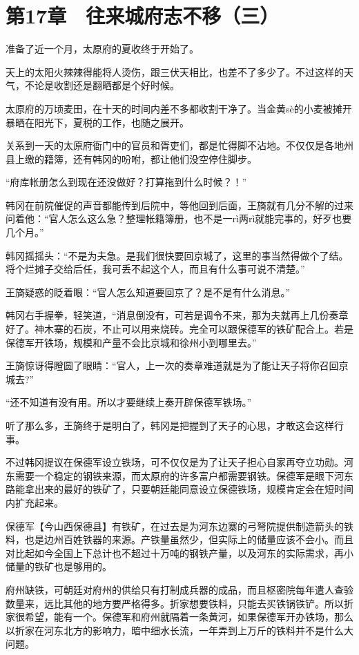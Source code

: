 \section{第17章　往来城府志不移（三）}

准备了近一个月，太原府的夏收终于开始了。

天上的太阳火辣辣得能将人烫伤，跟三伏天相比，也差不了多少了。不过这样的天气，不论是收割还是翻晒都是个好时候。

太原府的万顷麦田，在十天的时间内差不多都收割干净了。当金黄sè的小麦被摊开暴晒在阳光下，夏税的工作，也随之展开。

关系到一天的太原府衙门中的官员和胥吏们，都是忙得脚不沾地。不仅仅是各地州县上缴的籍簿，还有韩冈的吩咐，都让他们没空停住脚步。

“府库帐册怎么到现在还没做好？打算拖到什么时候？！”

韩冈在前院催促的声音都能传到后院中，等他回到后面，王旖就有几分不解的过来问着他：“官人怎么这么急？整理帐籍簿册，也不是一rì两rì就能完事的，好歹也要几个月。”

韩冈摇摇头：“不是为夫急。是我们很快要回京城了，这里的事当然得做个了结。将个烂摊子交给后任，我可丢不起这个人，而且有什么事可说不清楚。”

王旖疑惑的眨着眼：“官人怎么知道要回京了？是不是有什么消息。”

韩冈右手握拳，轻笑道，“消息倒没有，可若是调令不来，那为夫就再上几份奏章好了。神木寨的石炭，不止可以用来烧砖。完全可以跟保德军的铁矿配合上。若是保德军开铁场，规模和产量不会比京城和徐州小到哪里去。”

王旖惊讶得瞪圆了眼睛：“官人，上一次的奏章难道就是为了能让天子将你召回京城去?”

“还不知道有没有用。所以才要继续上奏开辟保德军铁场。”

听了那么多，王旖终于是明白了，韩冈是把握到了天子的心思，才敢这会这样行事。

不过韩冈提议在保德军设立铁场，可不仅仅是为了让天子担心自家再夺立功勋。河东需要一个稳定的钢铁来源，而太原府的许多富户都需要钢铁。保德军是眼下河东路能拿出来的最好的铁矿了，只要朝廷能同意设立保德铁场，规模肯定会在短时间内扩充起来。

保德军【今山西保德县】有铁矿，在过去是为河东边寨的弓弩院提供制造箭头的铁料，也是边州百姓铁器的来源。产铁量虽然少，但实际上的储量应该不会小。而且对比起如今全国上下总计也不超过十万吨的钢铁产量，以及河东的实际需求，再小储量的铁矿也是够用的。

府州缺铁，可朝廷对府州的供给只有打制成兵器的成品，而且枢密院每年遣人查验数量来，远比其他的地方要严格得多。折家想要铁料，只能去买铁锅铁铲。所以折家很希望，能有一个。保德军和府州就隔着一条黄河，如果保德军开办铁场，那么以折家在河东北方的影响力，暗中细水长流，一年弄到上万斤的铁料并不是什么大问题。

